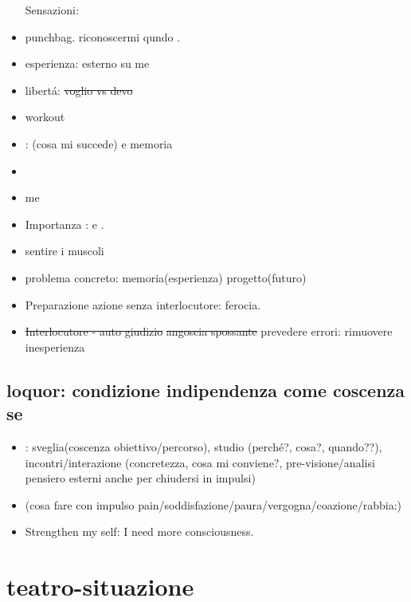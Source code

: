 \begin{itemize}
Sensazioni:   
\item {} punchbag. riconoscermi qundo .
\item esperienza:  esterno su me
\item libert\'a: \sout{voglio vs devo}
\item workout 
\item {}:   (cosa mi succede) e memoria
\item {}  
\item me
\item Importanza :  e .
\item sentire i muscoli
\item problema concreto: memoria(esperienza) progetto(futuro)
\item Preparazione azione senza interlocutore: ferocia.
\item \sout{Interlocutore - auto giudizio} \sout{angoscia spossante} prevedere errori: rimuovere inesperienza
\end{itemize}

\subsection{loquor: condizione indipendenza come coscenza se}

\begin{itemize}
\item {}: sveglia(coscenza obiettivo/percorso), studio (perch\'e?, cosa?, quando??), incontri/interazione (concretezza, cosa mi conviene?, pre-visione/analisi pensiero esterni anche per chiudersi in impulsi)
\item (cosa fare con impulso pain/soddisfazione/paura/vergogna/coazione/rabbia:)
\item Strengthen my self: I need more consciousness.
\end{itemize}

\section{teatro-situazione}

